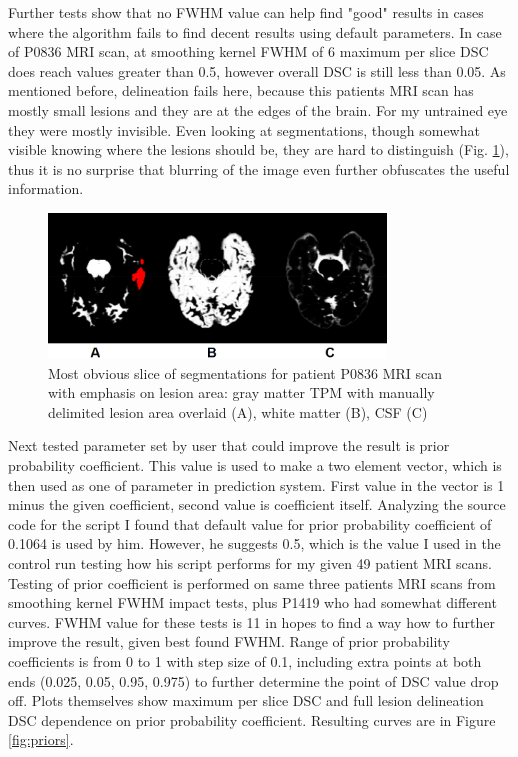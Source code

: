 \documentclass[12pt]{article}
\begin{document}
Further tests show that no FWHM value can help find "good" results in cases where the algorithm fails to find decent results using default parameters. In case of P0836 MRI scan, at smoothing kernel FWHM of 6 maximum per slice DSC does reach values greater than 0.5, however overall DSC is still less than 0.05. As mentioned before, delineation fails here, because this patients MRI scan has mostly small lesions and they are at the edges of the brain. For my untrained eye they were mostly invisible. Even looking at segmentations, though somewhat visible knowing where the lesions should be, they are hard to distinguish (Fig. \ref{fig:shittysegment}), thus it is no surprise that blurring of the image even further obfuscates the useful information.

\begin{figure}[!htb]
\centering
\includegraphics[width=0.8\textwidth]{img/inconclusiveSegmentation}
\caption{Most obvious slice of segmentations for patient P0836 MRI scan with emphasis on lesion area: gray matter TPM with manually delimited lesion area overlaid (A), white matter (B), CSF (C)}
\label{fig:shittysegment}
\end{figure}

Next tested parameter set by user that could improve the result is prior probability coefficient. This value is used to make a two element vector, which is then used as one of parameter in prediction system. First value in the vector is 1 minus the given coefficient, second value is coefficient itself. Analyzing the source code for the script I found that default value for prior probability coefficient of 0.1064 is used by him. However, he suggests 0.5, which is the value I used in the control run testing how his script performs for my given 49 patient MRI scans. Testing of prior coefficient is performed on same three patients MRI scans from smoothing kernel FWHM impact tests, plus P1419 who had somewhat different curves. FWHM value for these tests is 11 in hopes to find a way how to further improve the result, given best found FWHM. Range of prior probability coefficients is from 0 to 1 with step size of 0.1, including extra points at both ends (0.025, 0.05, 0.95, 0.975) to further determine the point of DSC value drop off. Plots themselves show maximum per slice DSC and full lesion delineation DSC dependence on prior probability coefficient. Resulting curves are in Figure \ref{fig:priors}.
\end{document}

